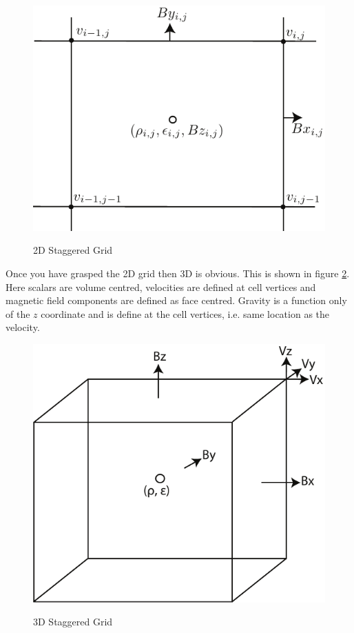 \documentclass[11pt]{article}
\begin{document}
\begin{figure}
\begin{center}{\includegraphics{2d-staggered-grid.pdf}}\end{center}
\caption{2D Staggered Grid}
\label{2d-staggered}
\end{figure}

Once you have grasped the 2D grid then 3D is obvious. This is shown in figure \ref{3d-staggered}. Here scalars are volume centred, velocities are defined at cell vertices and magnetic field components are defined as face centred. Gravity is a function only of the $z$ coordinate and is define at the cell vertices, i.e. same location as the velocity.
\begin{figure}
\begin{center}{\includegraphics{3d-staggered-grid.pdf}}\end{center}
\caption{3D Staggered Grid}
\label{3d-staggered}
\end{figure}
\end{document}
